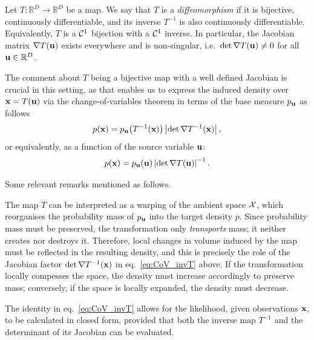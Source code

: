 \begin{definition}[Diffeomorphism]
Let $T:\mathbb{R}^D \to \mathbb{R}^D$ be a map. We say that $T$ is a \emph{diffeomorphism} if it is bijective, continuously differentiable, and its inverse $T^{-1}$ is also continuously differentiable. Equivalently, $T$ is a ${\mathcal C}^1$ bijection with a ${\mathcal C}^1$ inverse. In particular, the Jacobian matrix $\nabla T({ \mathbf{u}})$ exists everywhere and is non-singular, i.e.\ $\det \nabla T({ \mathbf{u}}) \neq 0$ for all ${ \mathbf{u}} \in \mathbb{R}^D$.
\end{definition}

The comment about $T$ being a bijective map with a well defined Jacobian is crucial in this setting, as that enables us to express the induced density over ${ \mathbf{x}} = T({ \mathbf{u}})$ via the change-of-variables theorem in terms of the base measure $p_{ \mathbf{u}}$ as follows 
\begin{equation}
\label{eq:CoV_invT}    
p({ \mathbf{x}})
=
p_{ \mathbf{u}}\!\left(T^{-1}({ \mathbf{x}})\right)
\left|
\det \nabla T^{-1}({ \mathbf{x}})
\right|,
\end{equation}
or equivalently, as a function of the source variable ${ \mathbf{u}}$:
\begin{equation}
\label{eq:CoV_T}    
p({ \mathbf{x}})
=
p_{ \mathbf{u}}({ \mathbf{u}})
\left|
\det \nabla T({ \mathbf{u}})
\right|^{-1}.
\end{equation}


Some relevant remarks mentioned as follows. 

\begin{remark}
The map $T$ can be interpreted as a warping of the ambient space ${\mathcal X}$, which reorganises the probability mass of $p_{ \mathbf{u}}$ into the target density $p$. Since probability mass must be preserved, the transformation only \emph{transports} mass; it neither creates nor destroys it. Therefore, local changes in volume induced by the map must be reflected in the resulting density, and this is precisely the role of the Jacobian factor $\det \nabla T^{-1}({ \mathbf{x}})$ in eq.~\eqref{eq:CoV_invT} above. If the transformation locally compesses the space, the density must increase accordingly to preserve mass; conversely, if the space is locally expanded, the density must decrease.
\end{remark}


\begin{remark}
The identity in eq.~\eqref{eq:CoV_invT} allows for the likelihood, given observations ${ \mathbf{x}}$, to be calculated in closed form, provided that both the inverse map $T^{-1}$ and the determinant of its Jacobian can be evaluated.
\end{remark}

